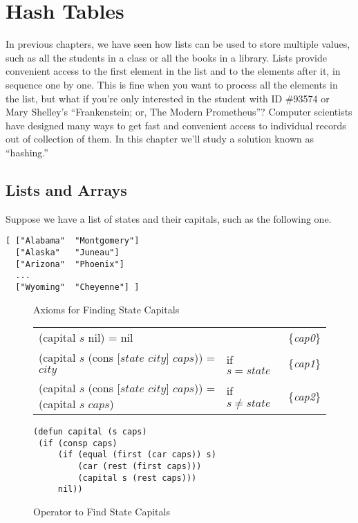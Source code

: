 \chapter{Hash Tables}
\label{ch:hash-tables}

In previous chapters, we have seen how lists can be used to store
multiple values, such as all the students in a class or all the books
in a library. Lists provide convenient access to the first element
in the list and to the elements after it, in sequence one by one.
This is fine when you want to
process all the elements in the list, but what if you're only interested
in the student with ID \#93574 or Mary Shelley's ``Frankenstein; or,
The Modern Prometheus''? 
Computer scientists have designed many
ways to get fast and convenient access
to individual records out of collection of them.
In this chapter we'll study a solution known as ``hashing.''

\section{Lists and Arrays}

Suppose we have a list of states and their capitals, 
such as the following one.\label{states-capitals-list}
\begin{Verbatim}
[ ["Alabama"  "Montgomery"]
  ["Alaska"   "Juneau"]
  ["Arizona"  "Phoenix"]
  ...
  ["Wyoming"  "Cheyenne"] ]
\end{Verbatim}

\begin{figure}
\begin{center}
Axioms for Finding State Capitals
\begin{tabular}{lll}
(capital $s$ nil) = nil                               &             & \{\emph{cap0}\} \\
(capital $s$ (cons [$state$ $city$] $caps$)) = $city$ &if $s=state$ & \{\emph{cap1}\} \\
(capital $s$ (cons [$state$ $city$] $caps$)) = (capital $s$ $caps$) & if $s \neq state$ & \{\emph{cap2}\} \\
\end{tabular}
\begin{Verbatim}
(defun capital (s caps)
 (if (consp caps)
     (if (equal (first (car caps)) s)
         (car (rest (first caps)))
         (capital s (rest caps)))
     nil))
\end{Verbatim}
\caption{Operator to Find State Capitals}
\label{fig:state-capital-operator}
\end{center}
\end{figure}

